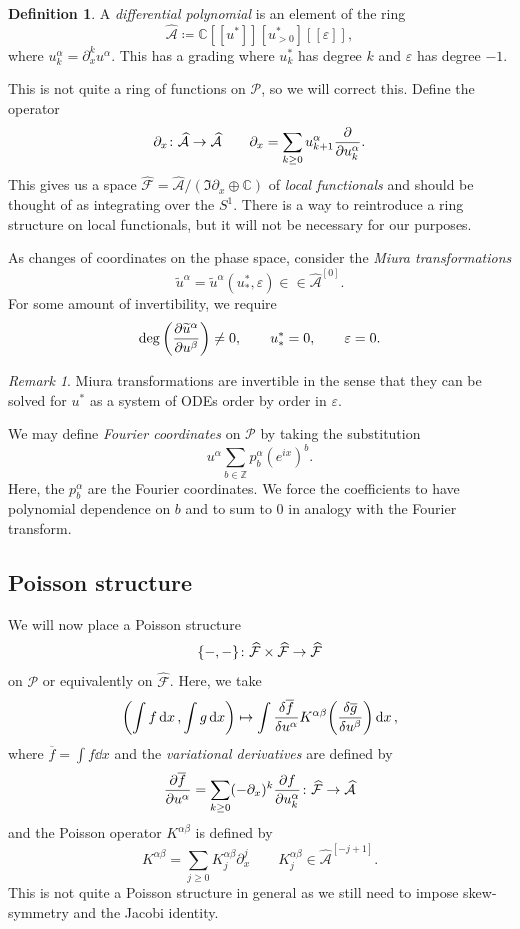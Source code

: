 \documentclass[leqno, openany]{memoir}
\theoremstyle{definition}
\newtheorem{defn}[thm]{Definition}
\theoremstyle{remark}
\newtheorem{rmk}[thm]{Remark}
\theoremstyle{plain}
\theoremstyle{definition}
\theoremstyle{remark}
\newcommand{\C}{\mathbb{C}}
\newcommand{\Z}{\mathbb{Z}}
\newcommand{\ep}{\varepsilon}
\newcommand{\mc}[1]{\mathcal{#1}}
\newcommand{\ol}[1]{\overline{#1}}
\newcommand{\wt}[1]{\widetilde{#1}}
\newcommand{\wh}[1]{\widehat{#1}}
\begin{document}
\begin{defn}
    A \textit{differential polynomial} is an element of the ring
    \[ \wh{\mc{A}} \coloneqq \C[[u^*]][u_{>0}^*][[\ep]], \]
    where $u_k^{\alpha} = \partial_x^k u^{\alpha}$. This has a grading where $u_k^*$ has degree $k$ and $\ep$ has degree $-1$.
\end{defn}

This is not quite a ring of functions on $\mc{P}$, so we will correct this. Define the operator
\[ \partial_x \colon \wh{\mc{A}} \to \wh{\mc{A}} \qquad \partial_x = \sum_{k \geq 0} u_{k+1}^{\alpha} \pdv{u_k^{\alpha}}. \]
This gives us a space $\wh{\mc{F}} = \wh{\mc{A}}/(\Im \partial_x \oplus \C)$ of \textit{local functionals} and should be thought of as integrating over the $S^1$. There is a way to reintroduce a ring structure on local functionals, but it will not be necessary for our purposes.

As changes of coordinates on the phase space, consider the \textit{Miura transformations}
\[ \wt{u}^{\alpha} = \wt{u}^{\alpha}(u_*^*, \ep) \in \in \wh{\mc{A}}^{[0]}. \]
For some amount of invertibility, we require
\[ \deg \qty(\pdv{\wt{u}^{\alpha}}{u^{\beta}}) \neq 0, \qquad u_*^* = 0, \qquad \ep = 0. \]

\begin{rmk}
    Miura transformations are invertible in the sense that they can be solved for $u^*$ as a system of ODEs order by order in $\ep$.
\end{rmk}

We may define \textit{Fourier coordinates} on $\mc{P}$ by taking the substitution
\[ u^{\alpha} \sum_{b \in \Z} p_b^{\alpha} (e^{ix})^b. \]
Here, the $p_b^{\alpha}$ are the Fourier coordinates. We force the coefficients to have polynomial dependence on $b$ and to sum to $0$ in analogy with the Fourier transform.

\subsection{Poisson structure}

We will now place a Poisson structure
\[ \qty{-,-} \colon \wh{\mc{F}} \times \wh{\mc{F}} \to \wh{\mc{F}} \]
on $\mc{P}$ or equivalently on $\wh{\mc{F}}$. Here, we take
\[ \qty(\int f \dd{x}, \int g \dd{x}) \mapsto \int \fdv{\ol{f}}{u^{\alpha}} K^{\alpha\beta} \qty(\fdv{\ol{g}}{u^{\beta}}) \dd{x}, \]
where $\ol{f} = \int f \dd{x}$ and the \textit{variational derivatives} are defined by
\[ \pdv{\ol{f}}{u^{\alpha}} = \sum_{k \geq 0} (-\partial_x)^k \pdv{f}{u_k^{\alpha}} \colon \wh{\mc{F}} \to \wh{\mc{A}} \] 
and the Poisson operator $K^{\alpha\beta}$ is defined by
\[ K^{\alpha\beta} = \sum_{j \geq 0} K_j^{\alpha\beta} \partial_x^j \qquad K_j^{\alpha\beta} \in \wh{\mc{A}}^{[-j+1]}. \] 
This is not quite a Poisson structure in general as we still need to impose skew-symmetry and the Jacobi identity.
\end{document}
